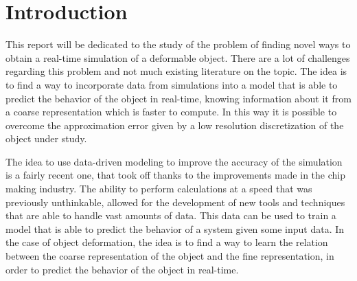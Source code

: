\section{Introduction}
This report will be dedicated to the study of the problem of finding novel ways to obtain a real-time simulation of a deformable object. There are a lot of challenges regarding this problem and not much existing literature on the topic. The idea is to find a way to incorporate data from simulations into a model that is able to predict the behavior of the object in real-time, knowing information about it from a coarse representation which is faster to compute. In this way it is possible to overcome the approximation error given by a low resolution discretization of the object under study. 

The idea to use data-driven modeling to improve the accuracy of the simulation is a fairly recent one, that took off thanks to the improvements made in the chip making industry. The ability to perform calculations at a speed that was previously unthinkable, allowed for the development of new tools and techniques that are able to handle vast amounts of data. This data can be used to train a model that is able to predict the behavior of a system given some input data. In the case of object deformation, the idea is to find a way to learn the relation between the coarse representation of the object and the fine representation, in order to predict the behavior of the object in real-time. 